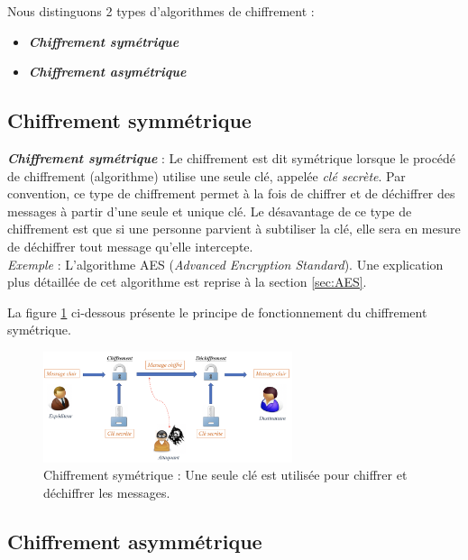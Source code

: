 \documentclass[oneside]{book}
\begin{document}
Nous distinguons 2 types d'algorithmes de chiffrement : 
\begin{itemize}
\item \textbf{\textit{Chiffrement symétrique}}
\item \textbf{\textit{Chiffrement asymétrique}}
\end{itemize}

\subsection{Chiffrement symmétrique}
\label{subsec:Chiffrement symmétrique}

\textbf{\textit{Chiffrement symétrique}} : Le chiffrement est dit symétrique lorsque le procédé de chiffrement (algorithme) utilise une seule clé, appelée \textit{clé secrète}. Par convention, ce type de chiffrement permet à la fois de chiffrer et de déchiffrer des messages à partir d'une seule et unique clé. Le désavantage de ce type de chiffrement est que si une personne parvient à subtiliser la clé, elle sera en mesure de déchiffrer tout message qu'elle intercepte.  \\
\textit{Exemple} : L'algorithme AES (\textit{Advanced Encryption Standard}). Une explication plus détaillée de cet algorithme est reprise à la section \ref{sec:AES}.

La figure \ref{fig:symétrique} ci-dessous présente le principe de fonctionnement du chiffrement symétrique.

\begin{figure}[htbp]
    \centering
    \includegraphics[width=0.65\textwidth]{image/symetrique}
    \caption{Chiffrement symétrique : Une seule clé est utilisée pour chiffrer et déchiffrer les messages.}
    \label{fig:symétrique}
\end{figure}


\subsection{Chiffrement asymmétrique}
\label{subsec:Chiffrement asymmétrique}
\end{document}
